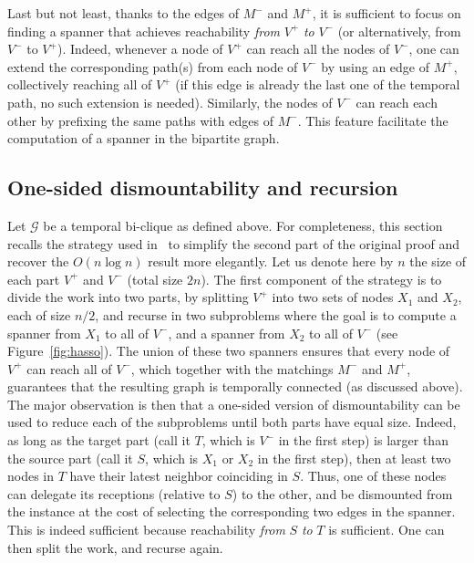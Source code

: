 \documentclass[USenglish, a4paper, thm-restate,numberwithinsect, cleveref]{lipics-v2021}
\newcommand{\G}{\ensuremath{\mathcal{G}}\xspace}
\begin{document}
Last but not least, thanks to the edges of $M^-$ and $M^+$, it is sufficient to focus on finding a spanner that achieves reachability \emph{from} $V^+$ \emph{to} $V^-$ (or alternatively, from $V^-$ to $V^+$). Indeed, whenever a node of $V^+$ can reach all the nodes of $V^-$, one can extend the corresponding path(s) from each node of $V^-$ by using an edge of $M^+$, collectively reaching all of $V^+$ (if this edge is already the last one of the temporal path, no such extension is needed). Similarly, the nodes of $V^-$ can reach each other by prefixing the same paths with edges of $M^-$. This feature facilitate the computation of a spanner in the bipartite graph.

\subsection{One-sided dismountability and recursion}
\label{sec:hasso}

Let $\G$ be a temporal bi-clique as defined above. For completeness, this section recalls the strategy used in~\cite{Hasso} to simplify the second part of the original proof and recover the $O(n \log n)$ result more elegantly.
Let us denote here by $n$ the size of each part $V^+$ and $V^-$ (total size $2n$).
The first component of the strategy is to divide the work into two parts, by splitting $V^+$ into two sets of nodes $X_1$ and $X_2$, each of size $n/2$, and recurse in two subproblems where the goal is to compute a spanner from $X_1$ to all of $V^-$, and a spanner from $X_2$ to all of $V^-$ (see Figure~\ref{fig:hasso}). The union of these two spanners ensures that every node of $V^+$ can reach all of $V^-$, which together with the matchings $M^-$ and $M^+$, guarantees that the resulting graph is temporally connected (as discussed above). The major observation is then that a one-sided version of dismountability can be used to reduce each of the subproblems until both parts have equal size. Indeed, as long as the target part (call it $T$, which is $V^-$ in the first step) is larger than the source part (call it $S$, which is $X_1$ or $X_2$ in the first step), then at least two nodes in $T$ have their latest neighbor coinciding in $S$. Thus, one of these nodes can delegate its receptions (relative to $S$) to the other, and be dismounted from the instance at the cost of selecting the corresponding two edges in the spanner. This is indeed sufficient because reachability \emph{from} $S$ \emph{to} $T$ is sufficient. One can then split the work, and recurse again. 
\end{document}
